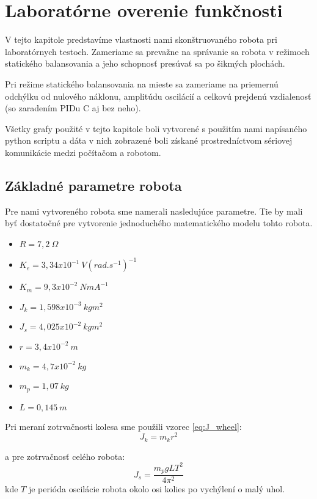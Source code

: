 \chapter{Laboratórne overenie funkčnosti}
\label{ch:chapFunc}

V tejto kapitole predstavíme vlastnosti nami skonštruovaného robota pri laboratórnych testoch. Zameriame sa prevažne na správanie sa robota v režimoch statického balansovania a jeho schopnosť presúvať sa po šikmých plochách.

Pri režime statického balansovania na mieste sa zameriame na priemernú odchýlku od nulového náklonu, amplitúdu oscilácií a celkovú prejdenú vzdialenosť (so zaradením PIDu C aj bez neho).

Všetky grafy použité v tejto kapitole boli vytvorené s použitím nami napísaného python scriptu a dáta v nich zobrazené boli získané prostredníctvom sériovej komunikácie medzi počítačom a robotom.  
\section{Základné parametre robota}
Pre nami vytvoreného robota sme namerali nasledujúce parametre. Tie by mali byť dostatočné pre vytvorenie jednoduchého matematického modelu tohto robota.

\begin{multicols}{2}
\begin{itemize}
\item{$R = 7,2 ~\Omega$}
\item{$K_e = 3,34x10^{-1}~V(rad.s^{-1})^{-1}$}
\item{$K_m = 9,3x10^{-2} ~ NmA^{-1}$}
\item{$J_k = 1,598x10^{-3}~ kgm^{2}$}
\item{$J_s = 4,025x10^{-2}~ kgm^{2}$}
\item{$r = 3,4x10^{-2}~ m$}
\item{$m_k = 4,7x10^{-2}~ kg$}
\item{$m_p = 1,07 ~kg$}
\item{$L = 0,145 ~m$}
\end{itemize}
\end{multicols}

Pri meraní zotrvačnosti kolesa sme použili vzorec \ref{eq:J_wheel}:
\begin{equation}
J_k = m_kr^2
\label{eq:J_wheel}
\end{equation}

a pre zotrvačnosť celého robota:
\begin{equation}
J_s = \dfrac{m_pgLT^2}{4\pi^2}
\label{eq:J_robot}
\end{equation}
kde $T$ je perióda oscilácie robota okolo osi kolies po vychýlení o malý uhol.
